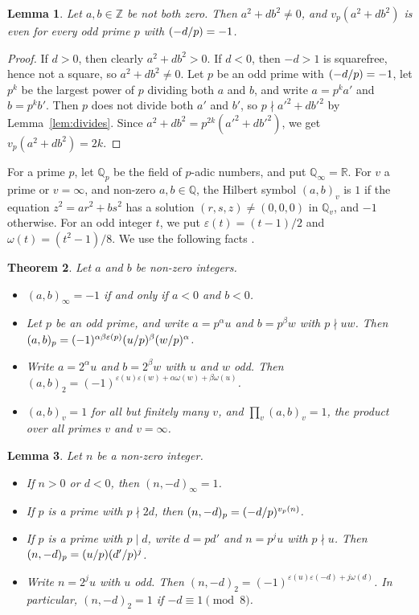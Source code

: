 \documentclass[11pt]{article}
\newtheorem{theorem}{Theorem}
\newtheorem{lemma}[theorem]{Lemma}
\newcommand{\Z}{\mathbb{Z}}
\newcommand{\Q}{\mathbb{Q}}
\newcommand{\leg}[2]{\mathchoice{\biggl(\dfrac{#1}{#2}\biggr)}{(#1/#2)}{(#1/#2)}{(#1/#2)}}
\begin{document}
\begin{lemma}\label{lem:even}
Let $a,b\in\Z$ be not both zero. Then $a^2+db^2\neq0$, and $v_p(a^2+db^2)$ is even for every odd prime $p$ with $\leg{-d}{p}=-1$.
\end{lemma}

\begin{proof}
If $d>0$, then clearly $a^2+db^2>0$. If $d<0$, then $-d>1$ is squarefree, hence not a square, so $a^2+db^2\neq0$. Let $p$ be an odd prime with $\leg{-d}{p}=-1$, let $p^k$ be the largest power of $p$ dividing both $a$ and $b$, and write $a=p^ka'$ and $b=p^kb'$. Then $p$ does not divide both $a'$ and $b'$, so $p\nmid a'^2+db'^2$ by Lemma~\ref{lem:divides}. Since $a^2+db^2=p^{2k}(a'^2+db'^2)$, we get $v_p(a^2+db^2)=2k$.
\end{proof}

For a prime $p$, let $\Q_p$ be the field of $p$-adic numbers, and put $\Q_\infty=\mathbb R$. For $v$ a prime or $v=\infty$, and non-zero $a,b\in\Q$, the Hilbert symbol $(a,b)_v$ is $1$ if the equation $z^2=ar^2+bs^2$ has a solution $(r,s,z)\neq(0,0,0)$ in $\Q_v$, and $-1$ otherwise. For an odd integer $t$, we put $\varepsilon(t)=(t-1)/2$ and $\omega(t)=(t^2-1)/8$. We use the following facts \cite[Chapter~III, Theorems~1 and~3]{Se}.

\begin{theorem}\label{thm:hilbert}
Let $a$ and $b$ be non-zero integers.
\begin{itemize}
\item[(i)] $(a,b)_\infty=-1$ if and only if $a<0$ and $b<0$.
\item[(ii)] Let $p$ be an odd prime, and write $a=p^\alpha u$ and $b=p^\beta w$ with $p\nmid uw$. Then $(a,b)_p=(-1)^{\alpha\beta\varepsilon(p)}\leg{u}{p}^\beta\leg{w}{p}^\alpha$.
\item[(iii)] Write $a=2^\alpha u$ and $b=2^\beta w$ with $u$ and $w$ odd. Then $(a,b)_2=(-1)^{\varepsilon(u)\varepsilon(w)+\alpha\omega(w)+\beta\omega(u)}$.
\item[(iv)] $(a,b)_v=1$ for all but finitely many $v$, and $\prod_v(a,b)_v=1$, the product over all primes $v$ and $v=\infty$.
\end{itemize}
\end{theorem}

\begin{lemma}\label{lem:local}
Let $n$ be a non-zero integer.
\begin{itemize}
\item[(a)] If $n>0$ or $d<0$, then $(n,-d)_\infty=1$.
\item[(b)] If $p$ is a prime with $p\nmid2d$, then $(n,-d)_p=\leg{-d}{p}^{v_p(n)}$.
\item[(c)] If $p$ is a prime with $p\mid d$, write $d=pd'$ and $n=p^ju$ with $p\nmid u$. Then $(n,-d)_p=\leg{u}{p}\leg{d'}{p}^j$.
\item[(d)] Write $n=2^ju$ with $u$ odd. Then $(n,-d)_2=(-1)^{\varepsilon(u)\varepsilon(-d)+j\omega(d)}$. In particular, $(n,-d)_2=1$ if $-d\equiv1\pmod8$.
\end{itemize}
\end{lemma}
\end{document}
